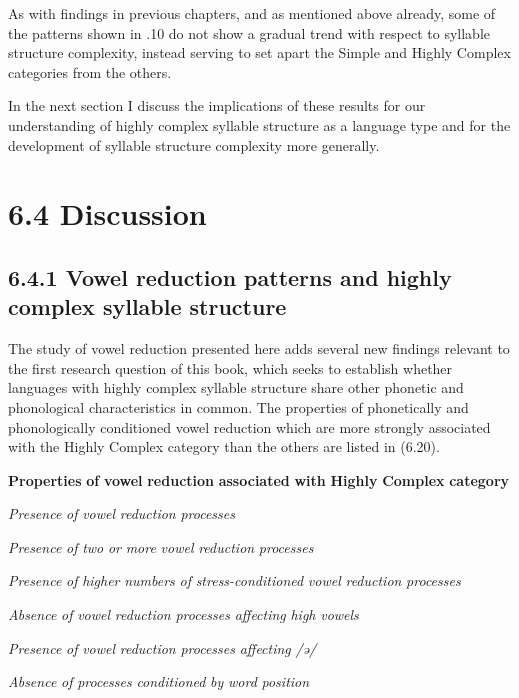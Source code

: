   As with findings in previous chapters, and as mentioned above already, some of the patterns shown in .10 do not show a gradual trend with respect to syllable structure complexity, instead serving to set apart the Simple and Highly Complex categories from the others.

  In the next section I discuss the implications of these results for our understanding of highly complex syllable structure as a language type and for the development of syllable structure complexity more generally.

\section{6.4 Discussion}
\subsection{6.4.1 Vowel reduction patterns and highly complex syllable structure}

  The study of vowel reduction presented here adds several new findings relevant to the first research question of this book, which seeks to establish whether languages with highly complex syllable structure share other phonetic and phonological characteristics in common. The properties of phonetically and phonologically conditioned vowel reduction which are more strongly associated with the Highly Complex category than the others are listed in (6.20).

\ea\label{ex:(6.20)}
  \textbf{Properties} \textbf{of} \textbf{vowel} \textbf{reduction} \textbf{associated} \textbf{with} \textbf{Highly} \textbf{Complex} \textbf{category}

\textit{Presence} \textit{of} \textit{vowel} \textit{reduction} \textit{processes}

\textit{Presence} \textit{of} \textit{two} \textit{or} \textit{more} \textit{vowel} \textit{reduction} \textit{processes}

\textit{Presence} \textit{of} \textit{higher} \textit{numbers} \textit{of} \textit{stress-conditioned} \textit{vowel} \textit{reduction} \textit{processes}

\textit{Absence} \textit{of} \textit{vowel} \textit{reduction} \textit{processes} \textit{affecting} \textit{high} \textit{vowels}

\textit{Presence} \textit{of} \textit{vowel} \textit{reduction} \textit{processes} \textit{affecting} \textit{/ə/}

\textit{Absence} \textit{of} \textit{processes} \textit{conditioned} \textit{by} \textit{word} \textit{position}

